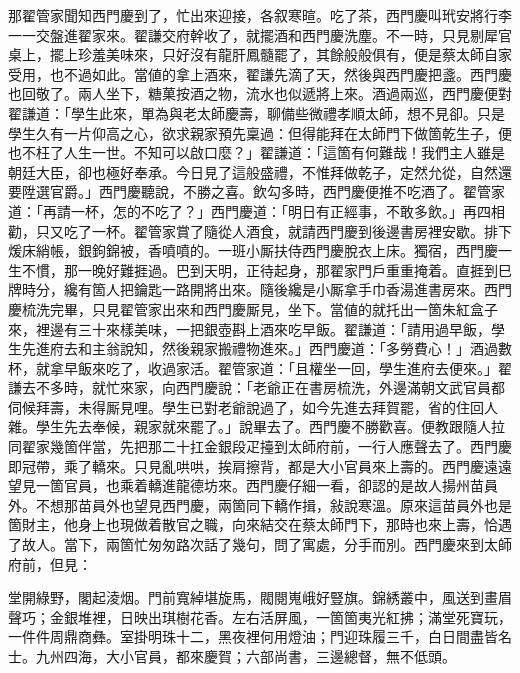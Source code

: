 那翟管家聞知西門慶到了，忙出來迎接，各叙寒暄。吃了茶，西門慶叫玳安將行李一一交盤進翟家來。翟謙交府幹收了，就擺酒和西門慶洗塵。不一時，只見剔犀官桌上，擺上珍羞美味來，只好沒有龍肝鳳髓罷了，其餘般般俱有，便是蔡太師自家受用，也不過如此。當値的拿上酒來，翟謙先滴了天，然後與西門慶把盞。西門慶也回敬了。兩人坐下，糖菓按酒之物，流水也似遞將上來。酒過兩巡，西門慶便對翟謙道：「學生此來，單為與老太師慶壽，聊備些微禮孝順太師，想不見卻。只是學生久有一片仰高之心，欲求親家預先稟過：但得能拜在太師門下做箇乾生子，便也不枉了人生一世。{}不知可以啟口麼？」翟謙道：「這箇有何難哉！我們主人雖是朝廷大臣，卻也極好奉承。今日見了這般盛禮，不惟拜做乾子，定然允從，自然還要陞選官爵。」{}西門慶聽說，不勝之喜。飲勾多時，西門慶便推不吃酒了。翟管家道：「再請一杯，怎的不吃了？」西門慶道：「明日有正經事，不敢多飲。」再四相勸，只又吃了一杯。翟管家賞了隨從人酒食，就請西門慶到後邊書房裡安歇。排下煖床綃帳，銀鉤錦被，香噴噴的。一班小厮扶侍西門慶脫衣上床。獨宿，西門慶一生不慣，那一晚好難捱過。巴到天明，正待起身，那翟家門戶重重掩着。直捱到巳牌時分，纔有箇人把鑰匙一路開將出來。隨後纔是小厮拿手巾香湯進書房來。西門慶梳洗完畢，只見翟管家出來和西門慶厮見，坐下。當値的就托出一箇朱紅盒子來，裡邊有三十來樣美味，一把銀壺斟上酒來吃早飯。翟謙道：「請用過早飯，學生先進府去和主翁說知，然後親家搬禮物進來。」西門慶道：「多勞費心！」酒過數杯，就拿早飯來吃了，收過家活。翟管家道：「且權坐一回，學生進府去便來。」翟謙去不多時，就忙來家，{}向西門慶說：「老爺正在書房梳洗，外邊滿朝文武官員都伺候拜壽，未得厮見哩。學生已對老爺說過了，如今先進去拜賀罷，省的住回人雜。學生先去奉候，親家就來罷了。」說畢去了。西門慶不勝歡喜。便教跟隨人拉同翟家幾箇伴當，先把那二十扛金銀段疋擡到太師府前，一行人應聲去了。西門慶即冠帶，乘了轎來。只見亂哄哄，挨肩擦背，都是大小官員來上壽的。西門慶遠遠望見一箇官員，也乘着轎進龍德坊來。西門慶仔細一看，卻認的是故人揚州苗員外。不想那苗員外也望見西門慶，兩箇同下轎作揖，敍說寒溫。原來這苗員外也是箇財主，他身上也現做着散官之職，向來結交在蔡太師門下，那時也來上壽，恰遇了故人。當下，兩箇忙匆匆路次話了幾句，問了寓處，分手而別。{}西門慶來到太師府前，但見：

\begin{myquote}
堂開綠野，閣起淩烟。門前寬綽堪旋馬，閥閱嵬峨好豎旗。錦綉叢中，風送到畫眉聲巧；金銀堆裡，日映出琪樹花香。左右活屏風，一箇箇夷光紅拂；滿堂死寶玩，一件件周鼎商彝。室掛明珠十二，黑夜裡何用燈油；門迎珠履三千，白日間盡皆名士。九州四海，大小官員，都來慶賀；六部尚書，三邊總督，無不低頭。
\end{myquote}

